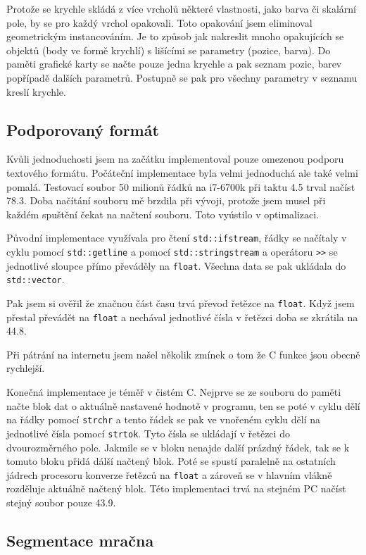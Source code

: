 Protože se krychle skládá z více vrcholů některé vlastnosti, jako barva či skalární pole, by se pro každý vrchol opakovali. Toto opakování jsem eliminoval geometrickým instancováním. Je to způsob jak nakreslit mnoho opakujících se objektů (body ve formě krychlí) s lišícími se parametry (pozice, barva). Do paměti grafické karty se načte pouze jedna krychle a pak seznam pozic, barev popřípadě dalších parametrů. Postupně se pak pro všechny parametry v seznamu kreslí krychle.

\subsection{Podporovaný formát}

Kvůli jednoduchosti jsem na začátku implementoval pouze omezenou podporu textového formátu. Počáteční implementace byla velmi jednoduchá ale také velmi pomalá. Testovací soubor 50 milionů řádků na i7-6700k při taktu 4.5 trval načíst 78.3. Doba načítání souboru mě brzdila při vývoji, protože jsem musel při každém spuštění čekat na načtení souboru. Toto vyústilo v optimalizaci.

Původní implementace využívala pro čtení \texttt{std::ifstream}, řádky se načítaly v cyklu pomocí \texttt{std::getline} a pomocí \texttt{std::stringstream} a operátoru \texttt{>>} se jednotlivé sloupce přímo převáděly na \texttt{float}. Všechna data se pak ukládala do \texttt{std::vector}.

Pak jsem si ověřil že značnou část času trvá převod řetězce na \texttt{float}. Když jsem přestal převádět na \texttt{float} a nechával jednotlivé čísla v řetězci doba se zkrátila na 44.8.

Při pátrání na internetu jsem našel několik zmínek o tom že C funkce jsou obecně rychlejší.

Konečná implementace je téměř v čistém C. Nejprve se ze souboru do paměti načte blok dat o aktuálně nastavené hodnotě v programu, ten se poté v cyklu dělí na řádky pomocí \texttt{strchr} a tento řádek se pak ve vnořeném cyklu dělí na jednotlivé čísla pomocí \texttt{strtok}. Tyto čísla se ukládají v řetězci do dvourozměrného pole. Jakmile se v bloku nenajde další prázdný řádek, tak se k tomuto bloku přidá dálší načtený blok. Poté se spustí paralelně na ostatních jádrech procesoru konverze řetězců na \texttt{float} a zároveň se v hlavním vlákně rozděluje aktuálně načtený blok. Této implementaci trvá na stejném PC načíst stejný soubor pouze 43.9.

\subsection{Segmentace mračna}

